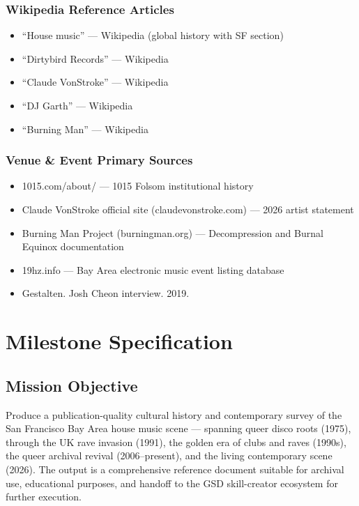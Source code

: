 \documentclass[11pt,letterpaper]{article}
\newcommand{\stageheader}[2]{%
  \noindent\colorbox{#2}{\makebox[\textwidth][l]{%
    \textcolor{white}{\bfseries\sffamily\hspace{6pt}#1\hspace{6pt}}}}%
  \vspace{0.5em}\par%
}
\begin{document}
\subsubsection{Wikipedia Reference Articles}
\begin{itemize}[leftmargin=1.5em, itemsep=0pt]
  \item ``House music'' --- Wikipedia (global history with SF section)
  \item ``Dirtybird Records'' --- Wikipedia
  \item ``Claude VonStroke'' --- Wikipedia
  \item ``DJ Garth'' --- Wikipedia
  \item ``Burning Man'' --- Wikipedia
\end{itemize}

\subsubsection{Venue \& Event Primary Sources}
\begin{itemize}[leftmargin=1.5em, itemsep=0pt]
  \item 1015.com/about/ --- 1015 Folsom institutional history
  \item Claude VonStroke official site (claudevonstroke.com) --- 2026 artist statement
  \item Burning Man Project (burningman.org) --- Decompression and Burnal Equinox documentation
  \item 19hz.info --- Bay Area electronic music event listing database
  \item Gestalten. Josh Cheon interview. 2019.
\end{itemize}

\newpage

\stageheader{STAGE 3 --- MISSION PACKAGE}{tertiary}

\section{Milestone Specification}

\subsection{Mission Objective}

Produce a publication-quality cultural history and contemporary survey of the San Francisco Bay Area house music scene --- spanning queer disco roots (1975), through the UK rave invasion (1991), the golden era of clubs and raves (1990s), the queer archival revival (2006--present), and the living contemporary scene (2026). The output is a comprehensive reference document suitable for archival use, educational purposes, and handoff to the GSD skill-creator ecosystem for further execution.
\end{document}
